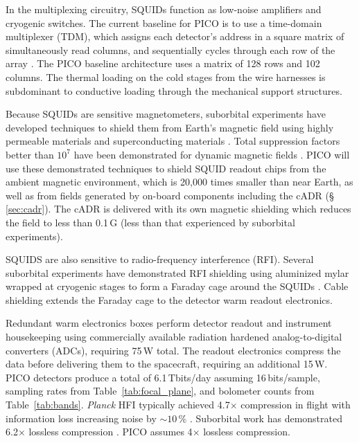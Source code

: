 In the multiplexing circuitry, SQUIDs function as low-noise amplifiers and cryogenic switches. The current baseline for PICO is to use a time-domain multiplexer (TDM), which assigns each detector's address in a square matrix of simultaneously read columns, and sequentially cycles through each row of the array \citep{Henderson2016}. The PICO baseline architecture uses a matrix of 128 rows and 102 columns.
The thermal loading on the cold stages from the wire harnesses is subdominant to conductive loading through the mechanical support structures.

Because SQUIDs are sensitive magnetometers, suborbital experiments
have developed techniques to shield them from Earth's magnetic field
using highly permeable materials and superconducting materials
\citep{Hui2018}.  Total suppression factors better than $10^7$ have
been demonstrated for dynamic magnetic fields \citep{Runyan2010}. PICO
will use these demonstrated techniques to shield SQUID readout chips
from the ambient magnetic environment, which is 20,000 times smaller
than near Earth, as well as from fields generated by on-board
components including the cADR (\S\,\ref{sec:cadr}). The cADR is
delivered with its own magnetic shielding which reduces the field to
less than 0.1\,G (less than that experienced by suborbital
experiments).

SQUIDS are also sensitive to radio-frequency interference
(RFI). Several suborbital experiments have demonstrated RFI shielding
using aluminized mylar wrapped at cryogenic stages to form a Faraday
cage around the SQUIDs \citep{Kermish2012,EBEX2018,BICEP2014}.
 Cable shielding extends the Faraday cage to
the detector warm readout electronics.

Redundant warm electronics boxes perform detector readout and
instrument housekeeping using commercially available radiation
hardened analog-to-digital converters (ADCs), requiring 75\,W total.
The readout electronics compress the data before delivering them to
the spacecraft, requiring an additional 15\,W. PICO detectors produce
a total of 6.1\,Tbits/day assuming 16\,bits/sample, sampling rates
from Table~\ref{tab:focal_plane}, and bolometer counts from
Table~\ref{tab:bands}. \textit{Planck} HFI typically achieved
4.7$\times$ compression in flight with information loss increasing
noise by $\sim10\,\%$ \citep{Pajot2018,PlanckHFI2011}. Suborbital work
has demonstrated 6.2$\times$ lossless compression
\citep{EBEX2017}. PICO assumes 4$\times$ lossless compression.

